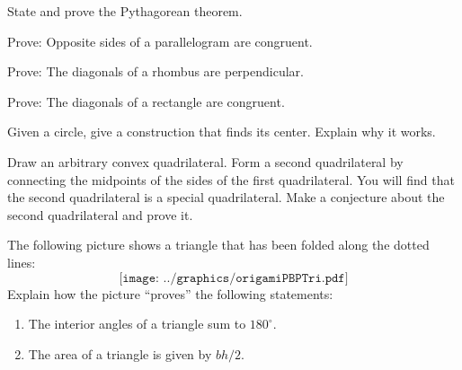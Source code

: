 \begin{prob}
State and prove the Pythagorean theorem.
\end{prob}

\begin{prob}
Prove:  Opposite sides of a parallelogram are congruent.
\end{prob}

\begin{prob}
Prove:  The diagonals of a rhombus are perpendicular.
\end{prob}

\begin{prob}
Prove:  The diagonals of a rectangle are congruent.
\end{prob}

\begin{prob}
Given a circle, give a construction that finds its center.  Explain why it works.  
\end{prob}

\begin{prob}
Draw an arbitrary convex quadrilateral.  Form a second quadrilateral by connecting the 
midpoints of the sides of the first quadrilateral.  You will find that the second quadrilateral 
is a special quadrilateral.  Make a conjecture about the second quadrilateral and prove it.  
\end{prob}

\begin{prob}
The following picture shows a triangle that has been folded
  along the dotted lines:
\[
\texttt{[image: ../graphics/origamiPBPTri.pdf]}
\]
Explain how the picture ``proves'' the following statements:
\begin{enumerate}
\item The interior angles of a triangle sum to $180^\circ$. 
\item The area of a triangle is given by $bh/2$. 
\end{enumerate}
\end{prob}

